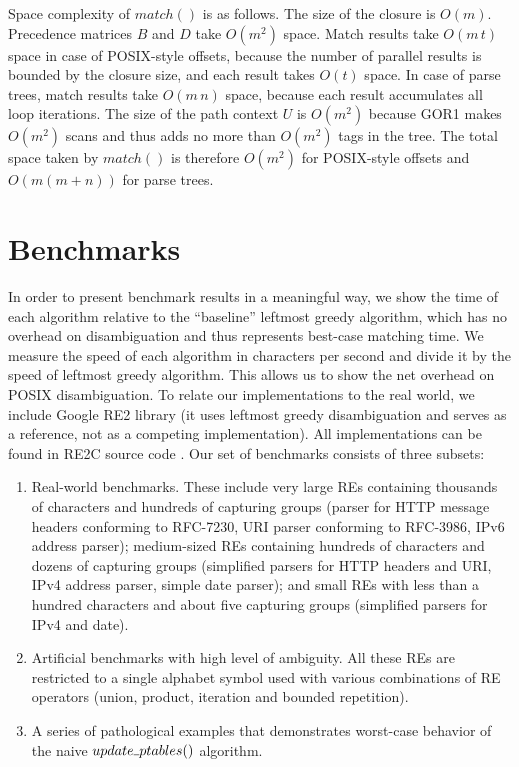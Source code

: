 \documentclass[AMA,STIX1COL]{WileyNJD-v2}
\newcommand{\Xund}{\rule{.4em}{.4pt}}
\begin{document}
Space complexity of $match()$ is as follows.
%
The size of the closure is $O(m)$.
%
Precedence matrices $B$ and $D$ take $O(m^2)$ space.
%
Match results take $O(m \, t)$ space in case of POSIX-style offsets,
because the number of parallel results is bounded by the closure size,
and each result takes $O(t)$ space.
In case of parse trees, match results take $O(m \, n)$ space, because each result accumulates all loop iterations.
%
The size of the path context $U$ is $O(m^2)$
because GOR1 makes $O(m^2)$ scans and thus adds no more than $O(m^2)$ tags in the tree.
The total space taken by $match()$ is therefore $O(m^2)$
for POSIX-style offsets and $O(m (m + n))$ for parse trees.


\section{Benchmarks}\label{section_benchmarks}

In order to present benchmark results in a meaningful way,
we show the time of each algorithm relative to the ``baseline'' leftmost greedy algorithm,
which has no overhead on disambiguation and thus represents best-case matching time.
%
We measure the speed of each algorithm in characters per second
and divide it by the speed of leftmost greedy algorithm.
%
This allows us to show the net overhead on POSIX disambiguation.
%
To relate our implementations to the real world,
we include Google RE2 library (it uses leftmost greedy disambiguation and serves as a reference, not as a competing implementation).
%
All implementations can be found in RE2C source code \cite{RE2C}.
%
Our set of benchmarks consists of three subsets:
\begin{enumerate}[itemsep=0.5em, topsep=0.5em]
    \item Real-world benchmarks.
        These include very large REs containing thousands of characters and hundreds of capturing groups
        (parser for HTTP message headers conforming to RFC-7230,
        URI parser conforming to RFC-3986,
        IPv6 address parser);
        medium-sized REs containing hundreds of characters and dozens of capturing groups
        (simplified parsers for HTTP headers and URI, IPv4 address parser, simple date parser);
        and small REs with less than a hundred characters and about five capturing groups
        (simplified parsers for IPv4 and date).

    \item Artificial benchmarks with high level of ambiguity.
        All these REs are restricted to a single alphabet symbol
        used with various combinations of RE operators (union, product, iteration and bounded repetition).

    \item A series of pathological examples that demonstrates worst-case behavior of the naive $update \Xund ptables ()$ algorithm.
\end{enumerate}
\end{document}
